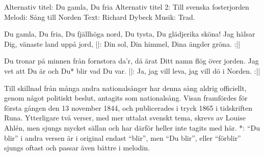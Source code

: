 \begin{song}

\begin{songmeta}
Alternativ titel: Du gamla, Du fria
Alternativ titel 2: Till svenska fosterjorden
Melodi: Sång till Norden
Text: Richard Dybeck
Musik: Trad.
\end{songmeta}

\begin{songtext}
Du gamla, Du fria, Du fjällhöga nord,
Du tysta, Du glädjerika sköna!
Jag hälsar Dig, vänaste land uppå jord,
||: Din sol, Din himmel, Dina ängder gröna. :||

Du tronar på minnen från fornstora da'r,
då ärat Ditt namn flög över jorden.
Jag vet att Du är och Du* blir vad Du var.
||: Ja, jag vill leva, jag vill dö i Norden. :||
\end{songtext}

\begin{songnotes}
Till skillnad från många andra nationalsånger har denna sång aldrig officiellt, genom något politiskt beslut, antagits som nationalsång. Visan framfördes för första gången den 13 november 1844, och publicerades i tryck 1865 i tidskriften Runa.
Ytterligare två verser, med mer uttalat svenskt tema, skrevs av Louise Ahlén, men sjungs mycket sällan och har därför heller inte tagits med här.
*: \textquotedblleft{}Du blir\textquotedblright{} i andra versen är i original endast \textquotedblleft{}blir\textquotedblright{}, men \textquotedblleft{}Du blir\textquotedblright{}, eller \textquotedblleft{}förblir\textquotedblright{} sjungs oftast och passar även bättre i melodin.
\end{songnotes}

\end{song}
